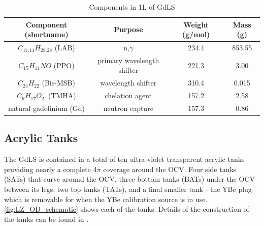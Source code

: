 \begin{table}
    \centering
    \begin{tabular}{c | c | c | c}
    \hline
    {Component (shortname)} & {Purpose} & {Weight (g/mol)} & {Mass (g)} \\ \hline
    $C_{17.14}H_{28.28}$ (LAB) & n,$\gamma$ & 234.4  & 853.55 \\
    $C_{15}H_{11}NO$ (PPO) & primary wavelength shifter & 221.3 & 3.00 \\
    $C_{24}H_{22}$ (Bis-MSB) & wavelength shifter & 310.4 & 0.015 \\
    $C_{9}H_{17}O^{-}_{2}$ (TMHA) & chelation agent & 157.2 & 2.58 \\
    natural gadolinium (Gd) & neutron capture & 157.3 & 0.86 
    \end{tabular}
    \caption{Components in 1L of GdLS}
    \label{tab:GdLS_Components}
\end{table} 


\subsection{Acrylic Tanks}
\par
The GdLS is contained in a total of ten ultra-violet transparent acrylic tanks providing nearly a complete 4$\pi$ coverage around the OCV.
Four side tanks (SATs) that curve around the OCV, three bottom tanks (BATs) under the OCV between its legs, two top tanks (TATs), and a final smaller tank - the YBe plug which is removable for when the YBe calibration source is in use.
\autoref{fig:LZ_OD_schematic} shows each of the tanks.
Details of the construction of the tanks can be found in \cite{scotthaselschwardt_thesis_ref}.

